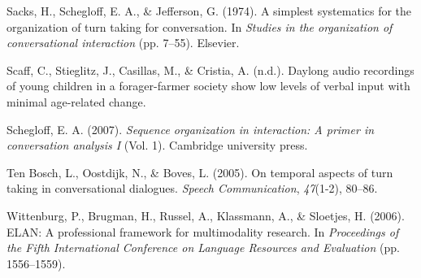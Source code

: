 \documentclass[10pt, letterpaper]{article}
\begin{document}
\leavevmode\hypertarget{ref-sacks1974simplest}{}%
Sacks, H., Schegloff, E. A., \& Jefferson, G. (1974). A simplest
systematics for the organization of turn taking for conversation. In
\emph{Studies in the organization of conversational interaction} (pp.
7--55). Elsevier.

\leavevmode\hypertarget{ref-scaffIPlanguage}{}%
Scaff, C., Stieglitz, J., Casillas, M., \& Cristia, A. (n.d.). Daylong
audio recordings of young children in a forager-farmer society show low
levels of verbal input with minimal age-related change.

\leavevmode\hypertarget{ref-schegloff2007sequence}{}%
Schegloff, E. A. (2007). \emph{Sequence organization in interaction: A
primer in conversation analysis I} (Vol. 1). Cambridge university press.

\leavevmode\hypertarget{ref-ten2005temporal}{}%
Ten Bosch, L., Oostdijk, N., \& Boves, L. (2005). On temporal aspects of
turn taking in conversational dialogues. \emph{Speech Communication},
\emph{47}(1-2), 80--86.

\leavevmode\hypertarget{ref-ELAN}{}%
Wittenburg, P., Brugman, H., Russel, A., Klassmann, A., \& Sloetjes, H.
(2006). ELAN: A professional framework for multimodality research. In
\emph{Proceedings of the Fifth International Conference on Language
Resources and Evaluation} (pp. 1556--1559).


\end{document}
